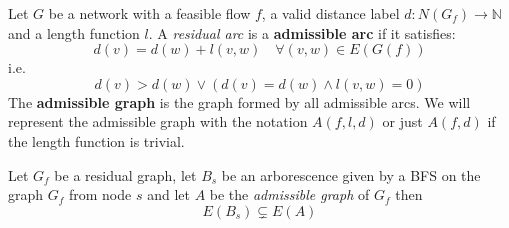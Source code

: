 \begin{definition}
    \label{AdmissibleGraph}
    Let $G$ be a network with a feasible flow $f$, a valid distance label $d: N(G_f) \rightarrow \mathbb{N}$ 
    and a length function $l$.
    A \textit{residual arc} is a \textbf{admissible arc} if it satisfies:
    \[d(v) = d(w) + l(v,w) \quad \forall (v,w) \in E(G(f))\]
    i.e.
    \[d(v) > d(w) \lor (d(v) = d(w) \land l(v,w) = 0)\]
    The \textbf{admissible graph} is the graph formed by all admissible arcs.
    We will represent the admissible graph with the notation $A(f,l,d)$ or just $A(f,d)$ if the length function is trivial.
\end{definition}


\begin{obs}{}{}
    Let $G_f$ be a residual graph, let $B_s$ be an arborescence given by a BFS on the graph $G_f$ from node $s$ and let $A$ be the \textit{admissible graph} of $G_f$ then
    \[E(B_s)\subsetneq E(A)\]
\end{obs}


